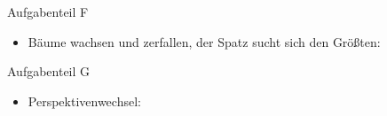 \documentclass{beamer}
\begin{document}
\begin{frame}{Aufgabenteil F}
\begin{itemize}
\item Bäume wachsen und zerfallen, der Spatz sucht sich den Größten:
\end{itemize}
\begin{figure}
    \centering
\end{figure}
\end{frame}

\begin{frame}{Aufgabenteil G}
\begin{itemize}
\item Perspektivenwechsel:
\end{itemize}
\begin{figure}
    \centering
\end{figure}
\end{frame}
\end{document}
